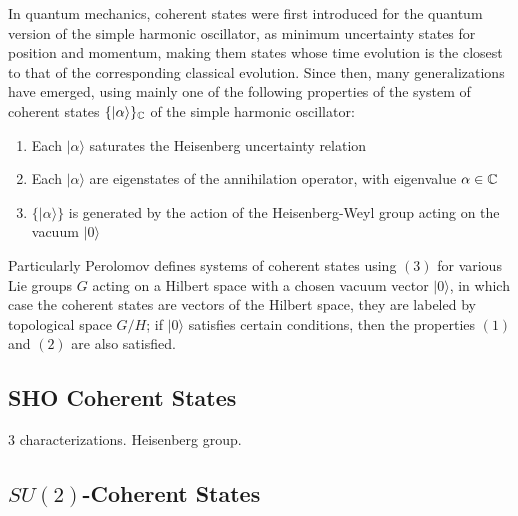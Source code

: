 In quantum mechanics, coherent states were first introduced for the quantum version of the simple harmonic oscillator, as minimum uncertainty states for position and momentum, making them states whose time evolution is the closest to that of the corresponding classical evolution. Since then, many generalizations have emerged, using mainly one of the following properties of the system of coherent states $\{|\alpha\rangle\}_{\mathbb{C}}$ of the simple harmonic oscillator:
    \begin{enumerate}
        
    \item Each $|\alpha\rangle$ saturates the Heisenberg uncertainty relation
    
    \item Each $|\alpha\rangle$ are eigenstates of the annihilation operator, with eigenvalue $\alpha \in \mathbb{C}$
    
    \item $\{|\alpha\rangle\}$ is generated by the action of the Heisenberg-Weyl group acting on the vacuum $|0\rangle$
        
    \end{enumerate}
Particularly Perolomov \cite{Perolomov} defines systems of coherent states using $(3)$ for various Lie groups $G$ acting on a Hilbert space with a chosen vacuum vector $|0\rangle$, in which case the coherent states are vectors of the Hilbert space, they are labeled by topological space $G/H$; if $|0\rangle$ satisfies certain conditions, then the properties $(1)$ and $(2)$ are also satisfied.

\subsection{SHO Coherent States}

{\color{gray} 3 characterizations. Heisenberg group.}
\subsection{$SU(2)$-Coherent States}


